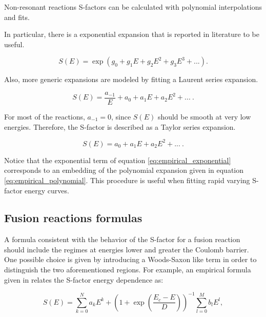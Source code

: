 \documentclass[openany]{book}
\begin{document}
Non-resonant reactions S-factors can be calculated with polynomial interpolations and fits. 

In particular, there is a exponential expansion that is reported in literature to be useful. 

\begin{equation} \label{eq:empirical_exponential}
	S(E) = \exp{(g_0 + g_1E + g_2E^2 + g_3E^3 + ...)}.
\end{equation}

Also, more generic expansions are modeled by fitting a Laurent series expansion. 

\begin{equation}  \label{eq:empirical_laurent}
	S(E) =\frac{ a_{-1}}{E} + a_0 + a_1 E + a_2 E^2 + ... \ .
\end{equation}

For most of the reactions, $a_{-1} = 0$, since $S(E)$ should be smooth at very low energies. Therefore, the S-factor is  described as a Taylor series expansion.

\begin{equation}  \label{eq:empirical_polynomial}
	S(E) = a_0 + a_1E + a_2 E^2 + ... \ .
\end{equation}

Notice that the exponential term of equation \ref{eq:empirical_exponential} corresponds to an embedding of the polynomial expansion given in equation \ref{eq:empirical_polynomial}. This procedure is useful when fitting rapid varying S-factor energy curves. 

\subsection{Fusion reactions formulas} \label{sub:empirical_fusion}

A formula consistent with the behavior of the S-factor for a  fusion reaction should include the regimes at energies lower and greater the Coulomb barrier. One possible choice is given by introducing a Woods-Saxon like term in order to distinguish the two aforementioned regions. For example, an empirical formula given in  \cite{beard_afanasjev_chamon_gasques_wiescher_yakovlev_2010} relates the S-factor energy dependence as:

\begin{equation} \label{eq:empirical_yakovlev}
	S(E) = \sum_{k=0}^{N} {a_kE^k} + \left(1 + \exp{\left( \frac{E_c - E}{D}\right)}\right)^{-1} \sum_{l=0}^{M} {b_lE^l},
\end{equation}
\end{document}
